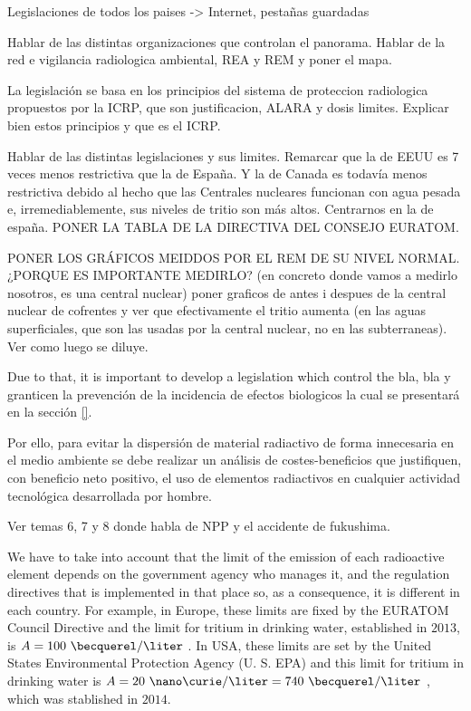 Legislaciones de todos los paises -> Internet, pestañas guardadas

Hablar de las distintas organizaciones que controlan el panorama. Hablar de la red e vigilancia radiologica ambiental, REA y REM y poner el mapa.

La legislación se basa en los principios del sistema de proteccion radiologica propuestos por la ICRP, que son justificacion, ALARA y dosis limites. Explicar bien estos principios y que es el ICRP.

Hablar de las distintas legislaciones y sus limites. Remarcar que la de EEUU es 7 veces menos restrictiva que la de España. Y la de Canada es todavía menos restrictiva debido al hecho que las Centrales nucleares funcionan con agua pesada e, irremediablemente, sus niveles de tritio son más altos. Centrarnos en la de españa. PONER LA TABLA DE LA DIRECTIVA DEL CONSEJO EURATOM.


PONER LOS GRÁFICOS MEIDDOS POR EL REM DE SU NIVEL NORMAL. ¿PORQUE ES IMPORTANTE MEDIRLO? (en concreto donde vamos a medirlo nosotros, es una central nuclear) poner graficos de antes i despues de la central nuclear de cofrentes y ver que efectivamente el tritio aumenta (en las aguas superficiales, que son las usadas por la central nuclear, no en las subterraneas). Ver como luego se diluye.



Due to that, it is important to develop a legislation which control the bla, bla y granticen la prevención de la incidencia de efectos biologicos la cual se presentará en la sección \ref{}. 

Por ello, para evitar la dispersión de material radiactivo de forma innecesaria en el medio ambiente se debe realizar un análisis de costes-beneficios que justifiquen, con beneficio neto positivo, el uso de elementos radiactivos en cualquier actividad tecnológica desarrollada por hombre.

Ver temas 6, 7 y 8 donde habla de NPP y el accidente de fukushima.


We have to take into account that the limit of the emission of each radioactive element depends on the government agency who manages it, and the regulation directives that is implemented in that place so, as a consequence, it is different in each country. For example, in Europe, these limits are fixed by the EURATOM Council Directive and the limit for tritium in drinking water, established in $2013$, is $A = 100~\becquerel/\liter$ \cite{100BqL}. In USA, these limits are set by the United States Environmental Protection Agency (U. S. EPA) and this limit for tritium in drinking water is $A = 20~\nano\curie/\liter = 740~\becquerel/\liter$ \cite{740BqL}, which was stablished in $2014$.